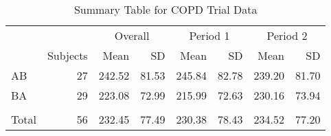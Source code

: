 \begin{table}

\caption{\label{tab:pefrDataSummary}Summary Table for COPD Trial Data}
\centering
\begin{tabular}[t]{l>{}r|rrrrrr}
\toprule
\multicolumn{2}{c}{ } & \multicolumn{2}{c}{Overall} & \multicolumn{2}{c}{Period 1} & \multicolumn{2}{c}{Period 2} \\
\cmidrule(l{3pt}r{3pt}){3-4} \cmidrule(l{3pt}r{3pt}){5-6} \cmidrule(l{3pt}r{3pt}){7-8}
 & Subjects & Mean & SD & Mean & SD & Mean & SD\\
\midrule
AB & 27 & 242.52 & 81.53 & 245.84 & 82.78 & 239.20 & 81.70\\
BA & 29 & 223.08 & 72.99 & 215.99 & 72.63 & 230.16 & 73.94\\
\midrule\\
Total & 56 & 232.45 & 77.49 & 230.38 & 78.43 & 234.52 & 77.20\\
\bottomrule
\end{tabular}
\end{table}
